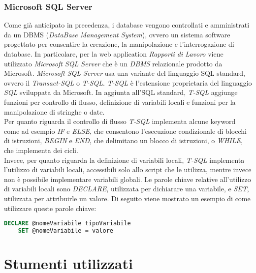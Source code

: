   \subsubsection{Microsoft SQL Server}
  Come già anticipato in precedenza, i database vengono controllati e amministrati da un DBMS (\textit{DataBase Management
  System}), ovvero un sistema software progettato per consentire la creazione, la manipolazione e l'interrogazione di database.
  In particolare, per la web application \textit{Rapporti di Lavoro} viene utilizzato \textit{Microsoft SQL Server} che è
  un \textit{DBMS} relazionale prodotto da Microsoft. \textit{Microsoft SQL Server} usa una variante del linguaggio SQL
  standard, ovvero il \textit{Transact-SQL} o \textit{T-SQL}. \textit{T-SQL} è l'estensione proprietaria del linguaggio
  \textit{SQL} sviluppata da Microsoft. In aggiunta all'SQL standard, \textit{T-SQL} aggiunge funzioni per controllo di flusso,
  definizione di variabili locali e funzioni per la manipolazione di stringhe o date.\\
  Per quanto riguarda il controllo di flusso \textit{T-SQL} implementa alcune keyword come ad esempio \textit{IF} e
  \textit{ELSE}, che consentono l'esecuzione condizionale di blocchi di istruzioni, \textit{BEGIN} e \textit{END}, che
  delimitano un blocco di istruzioni, o \textit{WHILE}, che implementa dei cicli.\\
  Invece, per quanto riguarda la definizione di variabili locali, \textit{T-SQL} implementa l'utilizzo di variabili locali,
  accessibili solo allo script che le utilizza, mentre invece non è possibile implementare variabili globali.
  Le parole chiave relative all'utilizzo di variabili locali sono \textit{DECLARE},
  utilizzata per dichiarare una variabile, e \textit{SET}, utilizzata per attribuirle un valore. Di seguito viene mostrato un
  esempio di come utilizzare queste parole chiave:
  \begin{lstlisting}[language=sql]
    DECLARE @nomeVariabile tipoVariabile
    SET @nomeVariabile = valore
  \end{lstlisting}

  \section{Stumenti utilizzati}

